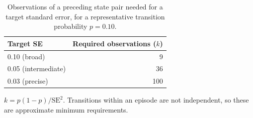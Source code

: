 \begin{table}[htbp]
\centering
\small
\caption{Observations of a preceding state pair needed for a target standard error, for a representative transition probability $p = 0.10$.}
\label{tab:s1_targets}
\begin{tabular*}{\linewidth}{@{\extracolsep{\fill}}lr}
\toprule
\textbf{Target SE} & \textbf{Required observations ($k$)} \\
\midrule
0.10 (broad) & 9 \\
0.05 (intermediate) & 36 \\
0.03 (precise) & 100 \\
\bottomrule
\end{tabular*}
\par\smallskip
\begin{minipage}{\linewidth}\footnotesize
$k = p(1-p)/\mathrm{SE}^2$. Transitions within an episode are not independent, so these are approximate minimum requirements.
\end{minipage}
\end{table}

